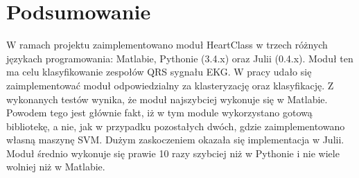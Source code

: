 \section{Podsumowanie}

W ramach projektu zaimplementowano moduł HeartClass w trzech różnych językach programowania: Matlabie, Pythonie (3.4.x) oraz Julii (0.4.x). Moduł ten ma celu klasyfikowanie zespołów QRS sygnału EKG. W pracy udało się zaimplementować moduł odpowiedzialny za klasteryzację oraz klasyfikację. Z wykonanych testów wynika, że moduł najszybciej wykonuje się w Matlabie. Powodem tego jest głównie fakt, iż w tym module wykorzystano gotową bibliotekę, a nie, jak w przypadku pozostałych dwóch, gdzie zaimplementowano własną maszynę SVM. Dużym zaskoczeniem okazała się implementacja w Julii. Moduł średnio wykonuje się prawie 10 razy szybciej niż w Pythonie i nie wiele wolniej niż w Matlabie.


